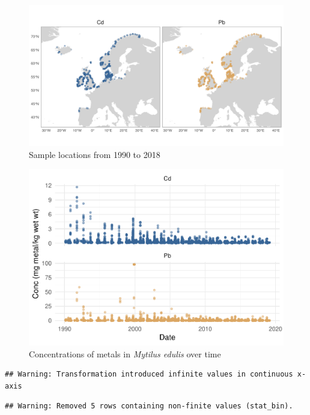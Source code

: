 \documentclass[
  12pt,
]{article}
\begin{document}
\begin{figure}
\includegraphics[width=0.9\linewidth]{./Output/StudyRegionMap} \caption{Sample locations from 1990 to 2018}\label{fig:unnamed-chunk-2}
\end{figure}

\begin{figure}
\centering
\includegraphics{McCrory_ENV972_Project_files/figure-latex/unnamed-chunk-3-1.pdf}
\caption{Concentrations of metals in \emph{Mytilus edulis} over time}
\end{figure}

\begin{verbatim}
## Warning: Transformation introduced infinite values in continuous x-axis
\end{verbatim}

\begin{verbatim}
## Warning: Removed 5 rows containing non-finite values (stat_bin).
\end{verbatim}
\end{document}
